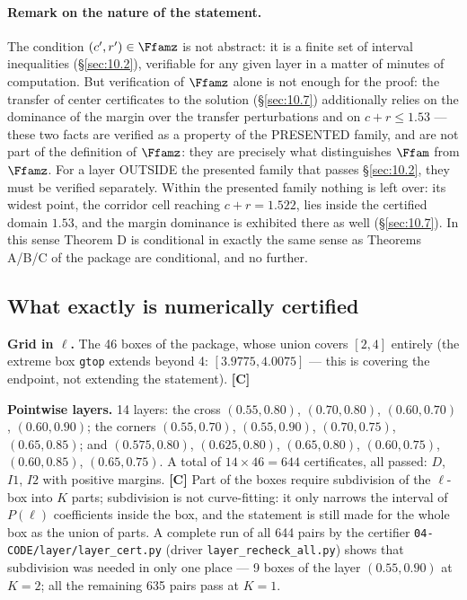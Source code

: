 \paragraph{Remark on the nature of the statement.} The condition $(c',r') \in \Ffamz$ is not
abstract: it is a finite set of interval inequalities (\S\ref{sec:10.2}), verifiable for
any given layer in a matter of minutes of computation. But verification of
$\Ffamz$ alone is not enough for the proof: the transfer of center certificates to
the solution (\S\ref{sec:10.7}) additionally relies on the dominance of the margin over
the transfer perturbations and on $c+r\le 1.53$ --- these two facts are verified
as a property of the PRESENTED family, and are not
part of the definition of $\Ffamz$: they are precisely what distinguishes $\Ffam$
from $\Ffamz$. For a layer OUTSIDE the presented family that
passes \S\ref{sec:10.2}, they must be verified separately. Within the presented family nothing is left over:
its widest point, the corridor cell reaching $c+r = 1.522$, lies inside the certified
domain $1.53$, and the margin dominance is exhibited there as well (\S\ref{sec:10.7}).
In this sense Theorem D is
conditional in exactly the same sense as Theorems A/B/C of the package are
conditional, and no further.



\subsection{What exactly is numerically certified}\label{sec:10.6}

\textbf{Grid in $\ell$.} The 46 boxes of the package, whose union covers $[2, 4]$
entirely (the extreme box \texttt{gtop} extends beyond 4: $[3.9775, 4.0075]$ --- this
is covering the endpoint, not extending the statement). \textbf{[C]}

\textbf{Pointwise layers.} 14 layers: the cross $(0.55,0.80)$, $(0.70,0.80)$,
$(0.60,0.70)$, $(0.60,0.90)$; the corners $(0.55,0.70)$, $(0.55,0.90)$,
$(0.70,0.75)$, $(0.65,0.85)$; and $(0.575,0.80)$, $(0.625,0.80)$, $(0.65,0.80)$,
$(0.60,0.75)$, $(0.60,0.85)$, $(0.65,0.75)$. A total of $14 \times 46 = 644$
certificates, all passed: $D$, $I1$, $I2$ with positive margins. \textbf{[C]}
Part of the boxes require subdivision of the $\ell$-box into $K$ parts;
subdivision is not curve-fitting: it only narrows the interval of $P(\ell)$
coefficients inside the box, and the statement is still made for the whole
box as the union of parts. A complete run of all 644 pairs by the certifier
\texttt{04-\allowbreak CODE/\allowbreak layer/\allowbreak layer\_\allowbreak cert.py} (driver \texttt{layer\_\allowbreak recheck\_\allowbreak all.py}) shows that
subdivision was needed in only one place --- 9 boxes of the layer $(0.55,0.90)$
at $K=2$; all the remaining 635 pairs pass at $K=1$.

